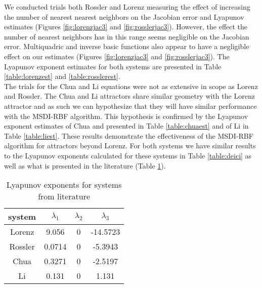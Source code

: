             We conducted trials both Rossler and Lorenz measuring the effect of increasing the number of nearest nearest
            neighbors on the Jacobian error and Lyapunov estimates (Figures \ref{fig:lorenzjac3} and \ref{fig:rosslerjac3}). However, the
            effect the number of nearest neighbors has in this range seems negligible on the Jacobian error. Multiquadric and inverse basic
            functions also appear to have a
            negligible effect on our estimates (Figures \ref{fig:lorenzjac3} and \ref{fig:rosslerjac3}).
            The Lyapunov exponent estimates for both systems are presented in Table \ref{table:lorenzest} and \ref{table:rosslerest}.\\


            The trials for the Chua and Li equations were not as extensive in scope as Lorenz and Rossler.
            The Chua and Li attractors share similar geometry with the Lorenz attractor and as such we can hypothesize that they will have
            similar performance with the MSDI-RBF algorithm. This hypothesis is confirmed by the Lyapunov exponent estimates of Chua and presented in Table \ref{table:chuaest}
            and of Li in Table \ref{table:liest}. These results demonstrate the effectiveness of the MSDI-RBF algorithm for attractors
            beyond Lorenz. For both systems we have similar results to the Lyapunov exponents calculated for these systems
            in Table \ref{table:deici} as well as what is presented in the literature (Table \ref{table:lit}).\\
            \begin{table}
                    \centering
                    \begin{tabular}[h]{||c c c c||}
                        \hline
                        system & $\lambda_1$ & $\lambda_2$ & $\lambda_3$ \\
                        \hline
                        Lorenz \cite{item:8} & 9.056 & 0  &  -14.5723\\
                        \hline
                        Rossler \cite{item:8} & 0.0714 & 0  &  -5.3943\\
                        \hline
                        Chua \cite{item:8} & 0.3271 &  0  &  -2.5197\\
                        \hline
                        Li \cite{item:6} & 0.131 & 0 & 1.131\\[1ex]
                        \hline
                    \end{tabular}\\
                    \caption{Lyapunov exponents for systems from literature}\label{table:lit}
                \end{table}

